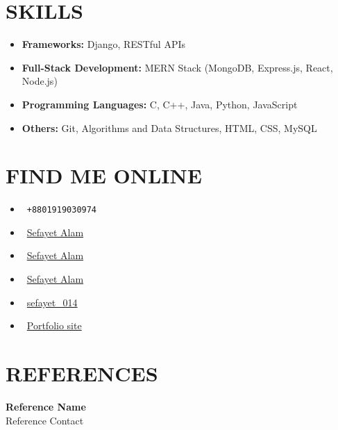 \documentclass[a4paper,10pt]{article}
\begin{document}
\begin{multicols}{2}
\section*{SKILLS}
\begin{itemize}[leftmargin=*]
    \item \textbf{Frameworks:} Django, RESTful APIs
    \item \textbf{Full-Stack Development:} MERN Stack (MongoDB, Express.js, React, Node.js)
    \item \textbf{Programming Languages:} C, C++, Java, Python, JavaScript
    \item \textbf{Others:} Git, Algorithms and Data Structures, HTML, CSS, MySQL
\end{itemize}

\section*{FIND ME ONLINE}
\begin{itemize}[leftmargin=*]
    \item \faPhone \ \texttt{+8801919030974}
    \item \faGithub \ \href{https://github.com/Sefayet-Alam}{Sefayet Alam}
    \item \faFacebook \ \href{https://www.facebook.com/profile.php?id=100006222377716}{Sefayet Alam}
    \item \faLinkedin \ \href{https://www.linkedin.com/in/sefayet-alam-833ab424/}{Sefayet Alam}
    \item \faInstagram \ \href{https://instagram.com/sefayet_014/}{sefayet\_014}
    \item \faGlobe \ \href{https://sefayet.xyz}{Portfolio site}
\end{itemize}

\section*{REFERENCES}
\textbf{Reference Name} \\
Reference Contact

\end{multicols}
\end{document}
